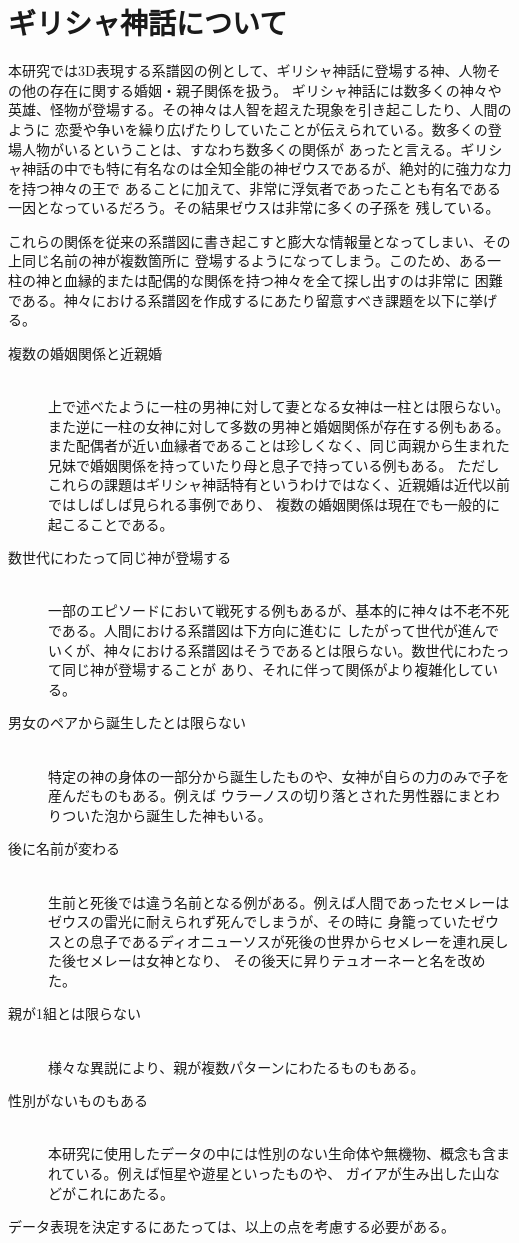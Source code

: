 \section{ギリシャ神話について}
\label{tag:greek}
本研究では3D表現する系譜図の例として、ギリシャ神話に登場する神、人物その他の存在に関する婚姻・親子関係を扱う。
ギリシャ神話には数多くの神々や英雄、怪物が登場する。その神々は人智を超えた現象を引き起こしたり、人間のように
恋愛や争いを繰り広げたりしていたことが伝えられている。数多くの登場人物がいるということは、すなわち数多くの関係が
あったと言える。ギリシャ神話の中でも特に有名なのは全知全能の神ゼウスであるが、絶対的に強力な力を持つ神々の王で
あることに加えて、非常に浮気者であったことも有名である一因となっているだろう。その結果ゼウスは非常に多くの子孫を
残している。

これらの関係を従来の系譜図に書き起こすと膨大な情報量となってしまい、その上同じ名前の神が複数箇所に
登場するようになってしまう。このため、ある一柱の神と血縁的または配偶的な関係を持つ神々を全て探し出すのは非常に
困難である。神々における系譜図を作成するにあたり留意すべき課題を以下に挙げる。
\begin{description}
  \item[複数の婚姻関係と近親婚]\mbox{}\\
    上で述べたように一柱の男神に対して妻となる女神は一柱とは限らない。
    また逆に一柱の女神に対して多数の男神と婚姻関係が存在する例もある。
    また配偶者が近い血縁者であることは珍しくなく、同じ両親から生まれた兄妹で婚姻関係を持っていたり母と息子で持っている例もある。
    ただしこれらの課題はギリシャ神話特有というわけではなく、近親婚は近代以前ではしばしば見られる事例であり、
    複数の婚姻関係は現在でも一般的に起こることである。
  \item[数世代にわたって同じ神が登場する]\mbox{}\\
    一部のエピソードにおいて戦死する例もあるが、基本的に神々は不老不死である。人間における系譜図は下方向に進むに
    したがって世代が進んでいくが、神々における系譜図はそうであるとは限らない。数世代にわたって同じ神が登場することが
    あり、それに伴って関係がより複雑化している。
  \item[男女のペアから誕生したとは限らない]\mbox{}\\
    特定の神の身体の一部分から誕生したものや、女神が自らの力のみで子を産んだものもある。例えば
    ウラーノスの切り落とされた男性器にまとわりついた泡から誕生した神もいる\cite{mythology}。
  \item[後に名前が変わる]\mbox{}\\
    生前と死後では違う名前となる例がある。例えば人間であったセメレーはゼウスの雷光に耐えられず死んでしまうが、その時に
    身籠っていたゼウスとの息子であるディオニューソスが死後の世界からセメレーを連れ戻した後セメレーは女神となり、
    その後天に昇りテュオーネーと名を改めた。
  \item[親が1組とは限らない]\mbox{}\\
    様々な異説により、親が複数パターンにわたるものもある。
  \item[性別がないものもある]\mbox{}\\
    本研究に使用したデータの中には性別のない生命体や無機物、概念も含まれている。例えば恒星や遊星といったものや、
    ガイアが生み出した山などがこれにあたる。
\end{description}
データ表現を決定するにあたっては、以上の点を考慮する必要がある。\\

